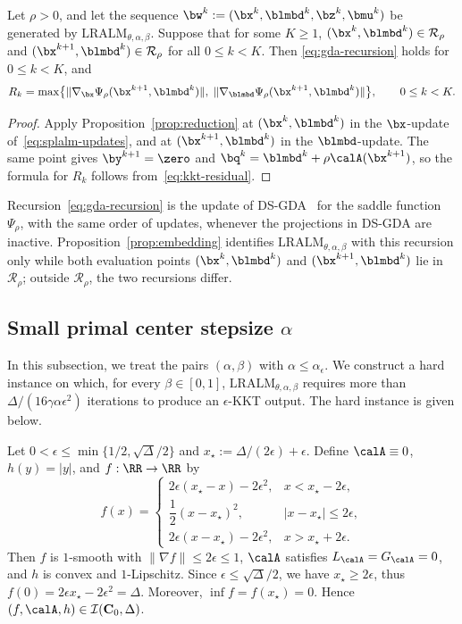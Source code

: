 \begin{proposition}[Embedding]
\label{prop:embedding}
Let \(\rho>0\), and let the sequence
\(\bw^k:=(\bx^k,\blmbd^k,\bz^k,\bmu^k)\) be generated by
\(\mathrm{LRALM}_{\theta,\alpha,\beta}\). Suppose that for some \(K\ge1\),
\((\bx^k,\blmbd^k)\in\mathcal R_\rho\) and
\((\bx^{k+1},\blmbd^k)\in\mathcal R_\rho\) for all \(0\le k<K\).
Then \eqref{eq:gda-recursion} holds for \(0\le k<K\), and
\[
R_k=\max\bigl\{\|\nabla_{\bx}\Psi_\rho(\bx^{k+1},\blmbd^k)\|,\;
\|\nabla_{\blmbd}\Psi_\rho(\bx^{k+1},\blmbd^k)\|\bigr\},
\qquad 0\le k<K.
\]
\end{proposition}

\begin{proof}
Apply Proposition~\ref{prop:reduction} at \((\bx^k,\blmbd^k)\) in the
\(\bx\)-update of~\eqref{eq:splalm-updates}, and at \((\bx^{k+1},\blmbd^k)\) in
the \(\blmbd\)-update. The same point gives \(\by^{k+1}=\zero\) and
\(\bq^k=\blmbd^k+\rho\calA(\bx^{k+1})\), so the formula for \(R_k\) follows
from~\eqref{eq:kkt-residual}.
\end{proof}

Recursion~\eqref{eq:gda-recursion} is the update of
DS-GDA~\cite{zheng2023universal} for the saddle function \(\Psi_\rho\), with
the same order of updates, whenever the projections in DS-GDA are inactive.
Proposition~\ref{prop:embedding} identifies
\(\mathrm{LRALM}_{\theta,\alpha,\beta}\) with this recursion only while both
evaluation points \((\bx^k,\blmbd^k)\) and \((\bx^{k+1},\blmbd^k)\) lie in
\(\mathcal R_\rho\); outside \(\mathcal R_\rho\), the two recursions differ.

\subsection{Small primal center stepsize $\alpha$}
\label{subsec:lb-plateau}

In this subsection, we treat the pairs \((\alpha,\beta)\) with
\(\alpha\le\alpha_\epsilon\). We construct a hard instance on which, for
every \(\beta\in[0,1]\), \(\mathrm{LRALM}_{\theta,\alpha,\beta}\) requires
more than \(\Delta/(16\gamma\alpha\epsilon^2)\) iterations to produce an
\(\epsilon\)-KKT output. The hard instance is given below.

\begin{example}
\label{ex:plateau}
Let \(0<\epsilon\le\min\{1/2,\sqrt{\Delta}/2\}\) and
\(x_\star:=\Delta/(2\epsilon)+\epsilon\). Define \(\calA\equiv0\),
\(h(y)=|y|\), and \(f:\RR\to\RR\) by
\[
f(x)=
\begin{cases}
2\epsilon(x_\star-x)-2\epsilon^2, & x<x_\star-2\epsilon,\\[4pt]
\dfrac12(x-x_\star)^2, & |x-x_\star|\le2\epsilon,\\[4pt]
2\epsilon(x-x_\star)-2\epsilon^2, & x>x_\star+2\epsilon.
\end{cases}
\]
Then \(f\) is \(1\)-smooth with \(\|\nabla f\|\le2\epsilon\le1\), \(\calA\) satisfies
\(L_{\calA}=G_{\calA}=0\), and \(h\) is convex and \(1\)-Lipschitz. Since
\(\epsilon\le\sqrt{\Delta}/2\), we have \(x_\star\ge2\epsilon\), thus \(f(0)=2\epsilon x_\star-2\epsilon^2=\Delta\). Moreover, \(\inf f=f(x_\star)=0\). Hence
\((f,\calA,h)\in\mathcal I(\mathbf C_0,\Delta)\).
\end{example}

